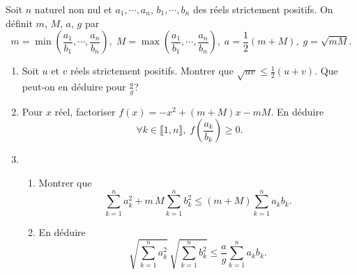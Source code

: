 Soit $n$ naturel non nul et $a_1, \cdots, a_n,\, b_1,\cdots ,b_n$ des réels strictement positifs.\newline
On définit $m$, $M$, $a$, $g$ par
\[
 m = \min(\frac{a_1}{b_1}, \cdots, \frac{a_n}{b_n}), \; M = \max(\frac{a_1}{b_1}, \cdots, \frac{a_n}{b_n}),\; a = \frac{1}{2}(m + M), \; g = \sqrt{m M}.
\]

\begin{enumerate}
 \item Soit $u$ et $v$ réels strictement positifs. Montrer que $\sqrt{u v} \leq \frac{1}{2}(u + v)$.\newline
Que peut-on en déduire pour $\frac{a}{g}$?

 \item Pour $x$ réel, factoriser $f(x) = -x^2 + (m+M)x -mM$. En déduire
\[
 \forall k \in \llbracket 1, n \rrbracket, \; f(\frac{a_k}{b_k}) \geq 0.
\]

 \item 
 \begin{enumerate}
 \item Montrer que 
\[
 \sum_{k=1}^{n}a_k^2 + m\,M \sum_{k=1}^{n}b_k^2 \leq (m+M) \sum_{k=1}^{n}a_kb_k. 
\]
  \item En déduire
\[
 \sqrt{\sum_{k=1}^{n}a_k^2}\, \sqrt{\sum_{k=1}^{n}b_k^2} \leq \frac{a}{g}\sum_{k=1}^{n}a_kb_k. 
\]

 \end{enumerate}


\end{enumerate}

